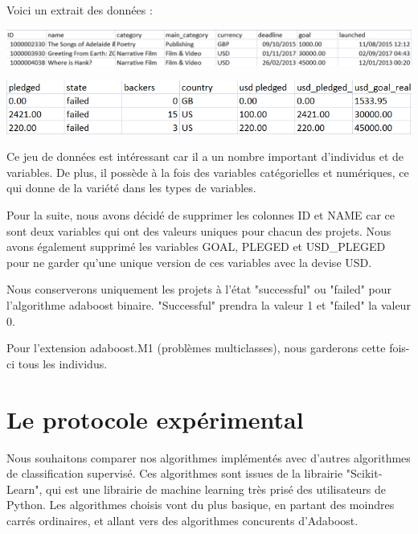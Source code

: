 \documentclass{article}
\begin{document}
\noindent Voici un extrait des données :

\begin{center} \includegraphics[scale=0.55]{extrait_donnees_partie1.PNG} \end{center}
\begin{center} \includegraphics[scale=0.55]{extrait_donnees_partie2.PNG} \end{center}
\noindent Ce jeu de données est intéressant car il a un nombre important d'individus et de variables. De plus, il possède à la fois des variables catégorielles et numériques, ce qui donne de la variété dans les types de variables. \newline

\noindent Pour la suite, nous avons décidé de supprimer les colonnes ID et NAME car ce sont deux variables qui ont des valeurs uniques pour chacun des projets. Nous avons également supprimé les variables GOAL, PLEGED et USD\_PLEGED pour ne garder qu'une unique version de ces variables avec la devise USD.\newline

\noindent Nous conserverons uniquement les projets à l'état "successful" ou "failed" pour l'algorithme adaboost binaire. "Successful" prendra la valeur 1 et "failed" la valeur 0.\newline

\noindent Pour l'extension adaboost.M1 (problèmes multiclasses), nous garderons cette fois-ci tous les individus.


\section{Le protocole expérimental}

Nous souhaitons comparer nos algorithmes implémentés avec d'autres algorithmes de classification supervisé. Ces algorithmes sont issues de la librairie "Scikit-Learn", qui est une librairie de machine learning très prisé des utilisateurs de Python. Les algorithmes choisis vont du plus basique, en partant des moindres carrés ordinaires, et allant vers des algorithmes concurents d'Adaboost.
\end{document}
